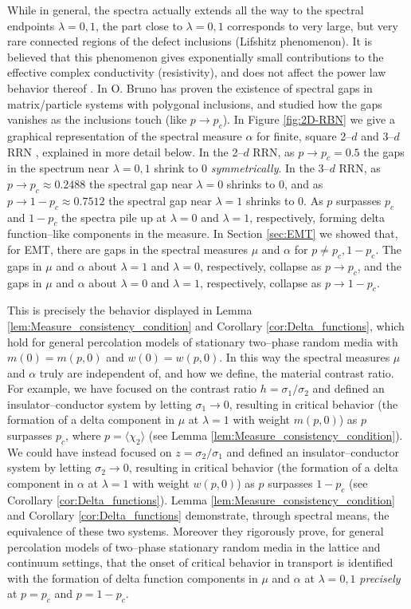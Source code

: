 \documentclass[english,12pt,jmp,graphicx]{revtex4-1}
\begin{document}
While in general, the spectra actually extends all the way to the
spectral endpoints $\lambda=0,1$, the part close to $\lambda=0,1$ corresponds to
very large, but very rare connected regions of the defect inclusions
(Lifshitz phenomenon). It is believed that this phenomenon gives
exponentially small contributions to the effective complex
conductivity (resistivity), and does not affect the power law behavior
thereof \cite{Golden:PRL-3935}. 
In \cite{Bruno:PRSLA-353} O. Bruno has proven the existence of
spectral gaps in matrix/particle systems with polygonal inclusions,
and studied how the gaps vanishes as the inclusions touch (like
$p\to p_c$). In Figure \ref{fig:2D-RBN} we give a graphical
representation of the spectral measure $\alpha$ for finite, square 2--$d$ and
3--$d$ RRN \cite{Golden:JoB:337}, explained in more detail below. In
the 2--$d$ RRN, as $p\to p_c=0.5$ the 
gaps in the spectrum near $\lambda=0,1$ shrink to 0 \emph{symmetrically}. In
the 3--$d$ RRN, as $p\to p_c\approx0.2488$ the spectral gap near $\lambda=0$ shrinks to
0, and as $p\to1-p_c\approx0.7512$ the spectral gap near $\lambda=1$ shrinks to 0.
As $p$ surpasses $p_c$ and $1-p_c$ the spectra pile up at $\lambda=0$ and
$\lambda=1$, respectively, forming delta function--like components in the
measure. In Section \ref{sec:EMT} we showed that, for EMT, there are
gaps in the spectral measures $\mu$ and $\alpha$ for $p\neq p_c,1-p_c$. The gaps
in $\mu$ and $\alpha$ about $\lambda=1$ and $\lambda=0$, respectively, collapse as
$p\to p_c$, and the gaps in $\mu$ and $\alpha$ about $\lambda=0$ and $\lambda=1$,
respectively, collapse as $p\to1-p_c$.

This is precisely the behavior displayed in  Lemma
\ref{lem:Measure_consistency_condition} and Corollary
\ref{cor:Delta_functions}, which hold for general percolation models of
stationary two--phase random media with $m(0)=m(p,0)$ and
$w(0)=w(p,0)$. In this way the spectral measures $\mu$ and $\alpha$ truly are
independent of, and how we define, the material contrast ratio. For 
example, we have focused on the contrast ratio $h=\sigma_1/\sigma_2$ and defined
an insulator--conductor system by letting $\sigma_1\to0$, resulting in
critical behavior (the formation of a delta component in $\mu$ at $\lambda=1$
with weight $m(p,0)$) as $p$ surpasses $p_c$, where $p=\langle\chi_2\rangle$ (see
Lemma \ref{lem:Measure_consistency_condition}). We could have instead
focused on $z=\sigma_2/\sigma_1$ and defined an insulator--conductor system by
letting $\sigma_2\to0$, resulting in critical behavior (the formation of a
delta component in $\alpha$ at $\lambda=1$ with weight $w(p,0)$) as $p$ surpasses
$1-p_c$ (see Corollary \ref{cor:Delta_functions}). Lemma
\ref{lem:Measure_consistency_condition} and Corollary
\ref{cor:Delta_functions} demonstrate, through spectral means, the
equivalence of these two systems. Moreover they rigorously prove, for
general percolation models of two--phase stationary random media in
the lattice and continuum settings, that the onset of critical
behavior in transport is identified with the formation of delta
function components in $\mu$ and $\alpha$ at $\lambda=0,1$ \emph{precisely} at
$p=p_c$ and $p=1-p_c$. 
 
\end{document}
